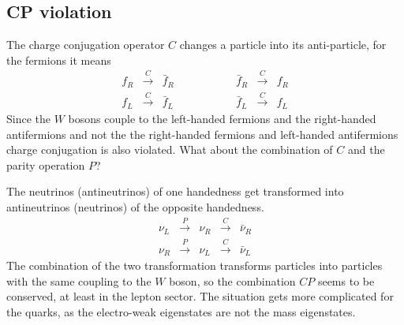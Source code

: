 \documentclass[12pt]{article}
\begin{document}
\subsection{CP violation}
%
%  
The charge conjugation operator $C$ changes a particle into its anti-particle, for the fermions it means
\[\begin{array}{ccccccc}
 f_R & \xrightarrow{C}&\bar f_R   &\qquad\qquad &    \bar f_R & \xrightarrow{C}& f_R \\
f_L & \xrightarrow{C}&\bar f_L    &&    \bar f_L & \xrightarrow{C}& f_L
\end{array}\]
Since the $W$ bosons couple to the left-handed fermions and the right-handed antifermions and not the the right-handed fermions and left-handed antifermions charge conjugation is also violated. What about the combination of $C$ and the parity operation $P$? 

The neutrinos (antineutrinos) of one handedness get transformed into antineutrinos (neutrinos) of the opposite handedness.  
\[\begin{array}{ccccc}
\nu_L & \xrightarrow{P}&\nu_R & \xrightarrow{C}&\bar\nu_R \\
\nu_R & \xrightarrow{P}&\nu_L & \xrightarrow{C}&\bar\nu_L 
\end{array}\]
The combination of the two transformation transforms particles into particles with the same coupling to the $W$ boson, so the combination $CP$ seems to be conserved, at least in the lepton sector. The situation gets more complicated for the quarks, as the electro-weak eigenstates are not the mass eigenstates.
%
%
\end{document}
